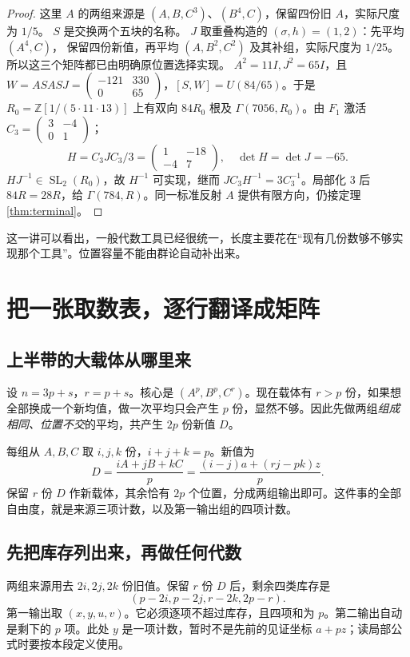 \documentclass[11pt,a4paper,oneside,openany]{book}
\newcommand{\Z}{\mathbb Z}
\newcommand{\SL}{\operatorname{SL}}
\theoremstyle{definition}
\numberwithin{equation}{chapter}
\begin{document}
\begin{proof}
这里 $A$ 的两组来源是 $(A,B,C^3)$、$(B^4,C)$，保留四份旧 $A$，实际尺度为 $1/5$。
$S$ 是交换两个五块的名称。
$J$ 取重叠构造的 $(\sigma,h)=(1,2)$：先平均 $(A^4,C)$，
保留四份新值，再平均 $(A,B^2,C^2)$ 及其补组，实际尺度为 $1/25$。
所以这三个矩阵都已由明确原位置选择实现。
$A^2=11I,J^2=65I$，且 $W=ASASJ=\left(\begin{smallmatrix}-121&330\\0&65\end{smallmatrix}\right)$，$[S,W]=U(84/65)$。于是 $R_0=\Z[1/(5\cdot11\cdot13)]$ 上有双向 $84R_0$ 根及 $\Gamma(7056,R_0)$。由 $F_1$ 激活 $C_3=\left(\begin{smallmatrix}3&-4\\0&1\end{smallmatrix}\right)$；
\[
H=C_3JC_3/3=\begin{pmatrix}1&-18\\-4&7\end{pmatrix},\quad
\det H=\det J=-65.
\]
$HJ^{-1}\in\SL_2(R_0)$，故 $H^{-1}$ 可实现，继而 $JC_3H^{-1}=3C_3^{-1}$。局部化 $3$ 后 $84R=28R$，给 $\Gamma(784,R)$。同一标准反射 $A$ 提供有限方向，仍接定理\ref{thm:terminal}。
\end{proof}
这一讲可以看出，一般代数工具已经很统一，长度主要花在“现有几份数够不够实现那个工具”。位置容量不能由群论自动补出来。

\chapter{把一张取数表，逐行翻译成矩阵}\label{app:upper}
\section{上半带的大载体从哪里来}
设 $n=3p+s$，$r=p+s$。核心是 $(A^p,B^p,C^r)$。现在载体有 $r>p$ 份，如果想全部换成一个新均值，做一次平均只会产生 $p$ 份，显然不够。因此先做两组\emph{组成相同、位置不交}的平均，共产生 $2p$ 份新值 $D$。

每组从 $A,B,C$ 取 $i,j,k$ 份，$i+j+k=p$。新值为
\[D=\frac{iA+jB+kC}{p}
=\frac{(i-j)a+(rj-pk)z}{p}.
\]
保留 $r$ 份 $D$ 作新载体，其余恰有 $2p$ 个位置，分成两组输出即可。这件事的全部自由度，就是来源三项计数，以及第一输出组的四项计数。

\section{先把库存列出来，再做任何代数}
两组来源用去 $2i,2j,2k$ 份旧值。保留 $r$ 份 $D$ 后，剩余四类库存是
\[(p-2i, p-2j, r-2k, 2p-r).
\]
第一输出取 $(x,y,u,v)$。它必须逐项不超过库存，且四项和为 $p$。第二输出自动是剩下的 $p$ 项。此处 $y$ 是一项计数，暂时不是先前的见证坐标 $a+pz$；读局部公式时要按本段定义使用。
\end{document}
